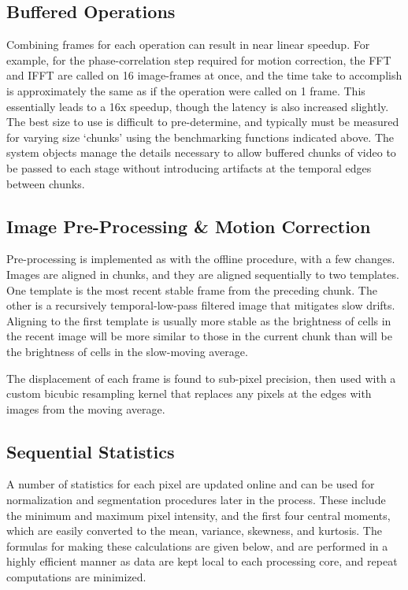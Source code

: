 \subsection{Buffered Operations}\label{buffered-operations}

Combining frames for each operation can result in near linear speedup.
For example, for the phase-correlation step required for motion
correction, the FFT and IFFT are called on 16 image-frames at once, and
the time take to accomplish is approximately the same as if the
operation were called on 1 frame. This essentially leads to a 16x
speedup, though the latency is also increased slightly. The best size to
use is difficult to pre-determine, and typically must be measured for
varying size `chunks' using the benchmarking functions indicated above.
The system objects manage the details necessary to allow buffered chunks
of video to be passed to each stage without introducing artifacts at the
temporal edges between chunks.

\subsection{Image Pre-Processing \& Motion
Correction}\label{image-pre-processing-motion-correction}

Pre-processing is implemented as with the offline procedure, with a few
changes. Images are aligned in chunks, and they are aligned sequentially
to two templates. One template is the most recent stable frame from the
preceding chunk. The other is a recursively temporal-low-pass filtered
image that mitigates slow drifts. Aligning to the first template is
usually more stable as the brightness of cells in the recent image will
be more similar to those in the current chunk than will be the
brightness of cells in the slow-moving average.

The displacement of each frame is found to sub-pixel precision, then
used with a custom bicubic resampling kernel that replaces any pixels at
the edges with images from the moving average.

\subsection{Sequential Statistics}\label{sequential-statistics}

A number of statistics for each pixel are updated online and can be used
for normalization and segmentation procedures later in the process.
These include the minimum and maximum pixel intensity, and the first
four central moments, which are easily converted to the mean, variance,
skewness, and kurtosis. The formulas for making these calculations are
given below, and are performed in a highly efficient manner as data are
kept local to each processing core, and repeat computations are
minimized.

